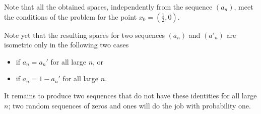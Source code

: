 Note that all the obtained spaces, independently from the sequence $(a_n)$, meet the conditions of the problem for the point $x_0=(\tfrac12,0)$.

Note yet that the resulting spaces for two sequences $(a_n)$ and $(a'_n)$ are isometric only in the following two cases 
\begin{itemize}
\item if $a_n=a_n'$ for all large $n$, or
\item if $a_n=1-a_n'$  for all large $n$.
\end{itemize}

It remains to produce two sequences that do not have these identities for all large $n$; 
two random sequences of zeros and ones will do the job with probability one.\qeds
